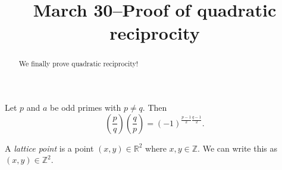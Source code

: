 \documentclass{ximera}
\title{March 30--Proof of quadratic reciprocity}
\begin{document}
  
\begin{abstract}  
We finally prove quadratic reciprocity!\end{abstract}  
\maketitle  

\begin{theorem}
 Let $p$ and $a$ be odd primes with $p\neq q$. Then \[\left(\frac{p}{q}\right)\left(\frac{q}{p}\right)=(-1)^{\frac{p-1}{2}\frac{q-1}{2}}.\]
\end{theorem}

\begin{definition}
 A \emph{lattice point} is a point $(x,y)\in\mathbb{R}^2$ where $x,y\in\mathbb{Z}$. We can write this as $(x,y)\in\mathbb{Z}^2$.
\end{definition}
\end{document}

